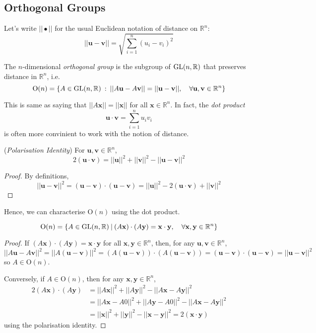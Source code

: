 \documentclass[10pt, a4paper, twoside]{report}
\begin{document}
\subsection{Orthogonal Groups}
Let's write \(||\bullet ||\) for the usual Euclidean notation of distance on \(\mathbb{R}^n\):
\[||\mathbf{u}-\mathbf{v}||=\sqrt{\sum_{i=1}^{n}(u_i-v_i)^2}\]
\begin{definition}
    The \(n\)-dimensional \emph{orthogonal group} is the subgroup of \(\operatorname{GL}(n,\mathbb{R})\) that preserves distance in \(\mathbb{R}^n\), i.e.
    \[\text{O}(n)=\{A\in\operatorname{GL}(n,\mathbb{R})\::\:||A\mathbf{u}-A\mathbf{v}||=||\mathbf{u}-\mathbf{v}||,\quad\forall \mathbf{u,v}\in\mathbb{R}^n\}\]
\end{definition}
\begin{remark}
    This is same as saying that \(||A\mathbf{x}||=||\mathbf{x}||\) for all \(\mathbf{x}\in\mathbb{R}^n\). In fact, the \emph{dot product}
    \[\mathbf{u}\cdot\mathbf{v}=\sum_{i=1}^nu_iv_i\]
    is often more convinient to work with the notion of distance.
\end{remark}
\begin{lemma}
    (\emph{Polarisation Identity}) For \(\mathbf{u},\mathbf{v}\in\mathbb{R}^n\), 
    \[2(\mathbf{u}\cdot\mathbf{v})=||\mathbf{u}||^2+||\mathbf{v}||^2-||\mathbf{u}-\mathbf{v}||^2\]
\end{lemma}
\begin{proof}
    By definitions,
    \[||\mathbf{u}-\mathbf{v}||^2=(\mathbf{u}-\mathbf{v})\cdot(\mathbf{u}-\mathbf{v})=||\mathbf{u}||^2-2(\mathbf{u}\cdot\mathbf{v})+||\mathbf{v}||^2\]
\end{proof}
Hence, we can characterise \(\mathrm{O}(n)\) using the dot product.
\begin{lemma}
    \[\mathrm{O}(n)=\{A\in\operatorname{GL}(n,\mathbb{R})\:|\:(A\mathbf{x})\cdot(A\mathbf{y})=\mathbf{x}\cdot\mathbf{y},\quad\forall\mathbf{x},\mathbf{y}\in\mathbb{R}^n\}\]
\end{lemma}
\begin{proof}
    If \((A\mathbf{x})\cdot(A\mathbf{y})=\mathbf{x}\cdot\mathbf{y}\) for all \(\mathbf{x},\mathbf{y}\in\mathbb{R}^n\), then, for any \(\mathbf{u},\mathbf{v}\in\mathbb{R}^n\),
    \[||A\mathbf{u}-A\mathbf{v}||^2=||A(\mathbf{u}-\mathbf{v})||^2=(A(\mathbf{u}-\mathbf{v}))\cdot(A(\mathbf{u}-\mathbf{v}))=(\mathbf{u}-\mathbf{v})\cdot(\mathbf{u}-\mathbf{v})=||\mathbf{u}-\mathbf{v}||^2\]
    so \(A\in\mathrm{O}(n)\).

    Conversely, if \(A\in\mathrm{O}(n)\), then for any \(\mathbf{x},\mathbf{y}\in\mathbb{R}^n\),
    \begin{align*}
        2(A\mathbf{x})\cdot(A\mathbf{y})&=||A\mathbf{x}||^2+||A\mathbf{y}||^2-||A\mathbf{x}-A\mathbf{y}||^2 \\
        &=||A\mathbf{x}-A0||^2+||A\mathbf{y}-A0||^2-||A\mathbf{x}-A\mathbf{y}||^2 \\
        &=||\mathbf{x}||^2+||\mathbf{y}||^2-||\mathbf{x}-\mathbf{y}||^2=2(\mathbf{x}\cdot\mathbf{y})
    \end{align*}
    using the polarisation identity.
\end{proof}
\end{document}
